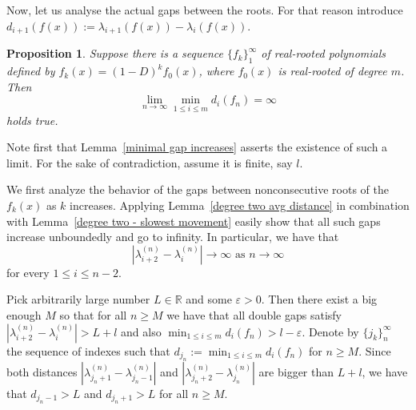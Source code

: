 \documentclass[11pt]{article}
\newtheorem{proposition}[theorem]{Proposition}
\begin{document}
Now, let us analyse the actual gaps between the roots. For that reason introduce $d_{i+1}(f(x)) := \lambda_{i+1}(f(x)) - \lambda_i(f(x))$.

\begin{proposition}
\label{miniamal gap is unbounded} 
Suppose there is a sequence $\{f_k\}_1^\infty$ of real-rooted polynomials defined by $f_k(x) = (1-D)^k f_0(x)$, where $f_0(x)$ is real-rooted of degree $m$. Then
\[\lim_{n\to\infty} \min_{1\leq i \leq m} d_i (f_n) = \infty\]
holds true.
\end{proposition}
\proof Note first that Lemma~\ref{minimal gap increases} asserts the existence of such a limit. For the sake of contradiction, assume it is finite, say $l$.

We first analyze the behavior of the gaps between nonconsecutive roots of the $f_k(x)$ as $k$ increases. Applying Lemma~\ref{degree two avg distance} in combination with Lemma~\ref{degree two - slowest movement} easily show that all such gaps increase unboundedly and go to infinity. In particular, we have that
\[|\lambda^{(n)}_{i+2} - \lambda^{(n)}_i|\to \infty\text{~as~$n\to\infty$}\]
for every $1\leq i \leq n-2$. 

Pick arbitrarily large number $L\in\mathbb{R}$ and some $\varepsilon > 0$. Then there exist a big enough $M$ so that for all $n\geq M$ we have that all double gaps satisfy $|\lambda^{(n)}_{i+2} - \lambda^{(n)}_i| > L + l$ and also $\min_{1\leq i \leq m} d_i (f_n)> l - \varepsilon$. Denote by $\{j_k\}_{n}^{\infty}$ the sequence of indexes such that $d_{j_n}:=\min_{1\leq i \leq m} d_i (f_n)$ for $n\geq M$. Since both distances $|\lambda^{(n)}_{j_n+1} - \lambda^{(n)}_{j_n-1}|$ and $|\lambda^{(n)}_{j_n+2} - \lambda^{(n)}_{j_n}|$ are bigger than $L + l$, we have that $d_{j_n-1}> L$ and $d_{j_n+1} > L$ for all $n\geq M$.
\end{document}
